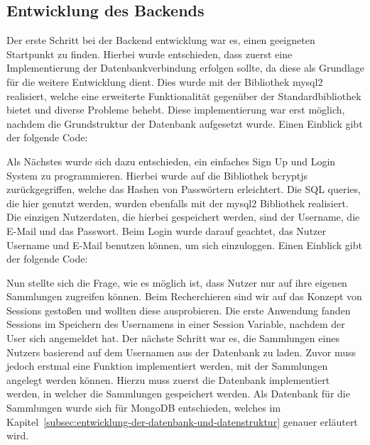 \vspace{1em}

\vspace{1em}

\newpage

\subsection{Entwicklung des Backends}\label{subsec:EntwicklungDesBackends}
Der erste Schritt bei der Backend entwicklung war es, einen geeigneten Startpunkt zu finden.
Hierbei wurde entschieden, dass zuerst eine Implementierung der Datenbankverbindung erfolgen sollte, da diese als Grundlage für die weitere Entwicklung dient.
Dies wurde mit der Bibliothek mysql2 realisiert, welche eine erweiterte Funktionalität gegenüber der Standardbibliothek bietet und diverse Probleme behebt.
Diese implementierung war erst möglich, nachdem die Grundstruktur der Datenbank aufgesetzt wurde.
Einen Einblick gibt der folgende Code:

\vspace{1em}

\vspace{1em}
\newpage

Als Nächstes wurde sich dazu entschieden, ein einfaches Sign Up und Login System zu programmieren.
Hierbei wurde auf die Bibliothek bcryptjs zurückgegriffen, welche das Hashen von Passwörtern erleichtert.
Die SQL queries, die hier genutzt werden, wurden ebenfalls mit der mysql2 Bibliothek realisiert.
Die einzigen Nutzerdaten, die hierbei gespeichert werden, sind der Username, die E-Mail und das Passwort.
Beim Login wurde darauf geachtet, das Nutzer Username und E-Mail benutzen können, um sich einzuloggen.
Einen Einblick gibt der folgende Code:

\vspace{1em}

\vspace{1em}

Nun stellte sich die Frage, wie es möglich ist, dass Nutzer nur auf ihre eigenen Sammlungen zugreifen können.
Beim Recherchieren sind wir auf das Konzept von Sessions gestoßen und wollten diese ausprobieren.
Die erste Anwendung fanden Sessions im Speichern des Usernamens in einer Session Variable, nachdem der User sich angemeldet hat.
Der nächste Schritt war es, die Sammlungen eines Nutzers basierend auf dem Usernamen aus der Datenbank zu laden.
Zuvor muss jedoch erstmal eine Funktion implementiert werden, mit der Sammlungen angelegt werden können.
Hierzu muss zuerst die Datenbank implementiert werden, in welcher die Sammlungen gespeichert werden.
Als Datenbank für die Sammlungen wurde sich für MongoDB entschieden, welches im Kapitel~\ref{subsec:entwicklung-der-datenbank-und-datenstruktur} genauer erläutert wird.

